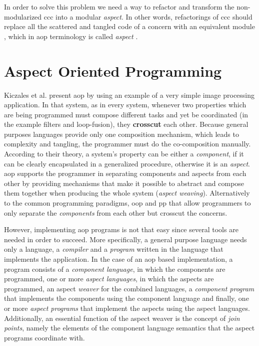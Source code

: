 In order to solve this problem we need a way to refactor and transform the non-modularized \ac{ccc} into a modular \textit{aspect}.
In other words, refactorings of \ac{ccc} should replace all the scattered and tangled code of a concern with an equivalent module \cite{hannemann2005role}, which in \ac{aop} terminology is called \textit{aspect} \cite{kiczales1997aspect}.

\section{Aspect Oriented Programming}\label{Aspect Oriented Programming}

Kiczales et al. present \ac{aop} \cite{kiczales1997aspect} by using an example of a very simple image processing application. 
In that system, as in every system, whenever two properties which are being programmed must compose different tasks and yet be coordinated (in the example filters and loop-fusion), they \textbf{crosscut} each other.
Because general purposes languages provide only one composition mechanism, which leads to complexity and tangling, the programmer must do the co-composition manually.
According to their theory, a system's property can be either a \textit{component}, if it can be clearly encapsulated in a generalized procedure, otherwise it is an \textit{aspect}.
\ac{aop} supports the programmer in separating components and aspects from each other by providing mechanisms that make it possible to abstract and compose them together when producing the whole system (\textit{aspect weaving}).
Alternatively to the common programming paradigms, \ac{oop} and \ac{pp} that allow programmers to only separate the \textit{components} from each other but crosscut the concerns.

However, implementing \ac{aop} programs is not that easy since several tools are needed in order to succeed. 
More specifically, a general purpose language needs only a language, a \textit{compiler} and a \textit{program} written in the language that implements the application.
In the case of an \ac{aop} based implementation, a program consists of a \textit{component language}, in which the components are programmed, one or more \textit{aspect languages}, in which the aspects are programmed, an aspect \textit{weaver} for the combined languages, a \textit{component program} that implements the components using the component language and finally, one or more \textit{aspect programs} that implement the aspects using the aspect languages.
Additionally, an essential function of the aspect weaver is the concept of \textit{join points}, namely the elements of the component language semantics that the aspect programs coordinate with. 

